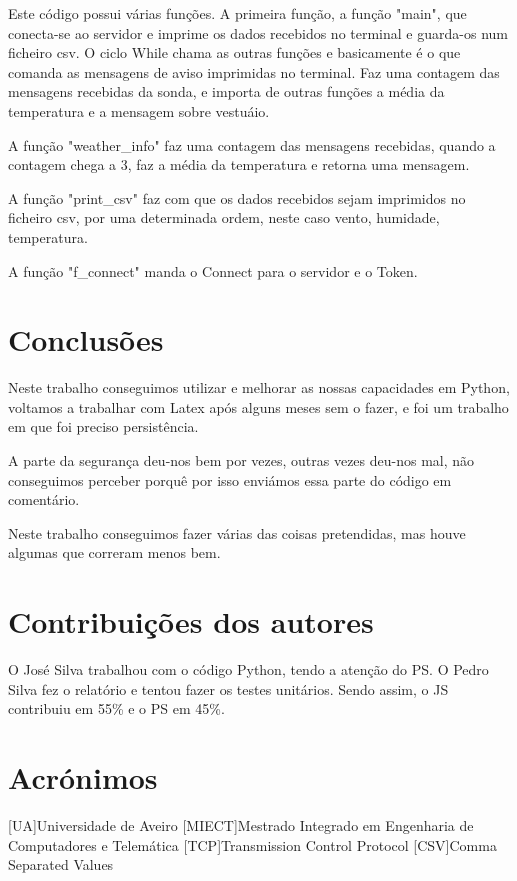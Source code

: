 \documentclass{report}
\begin{document}
Este código possui várias funções.
A primeira função, a função "main", que conecta-se ao servidor e imprime os dados recebidos no terminal e guarda-os num ficheiro \ac{csv}. 
O ciclo While chama as outras funções e basicamente é o que comanda as mensagens de aviso imprimidas no terminal. Faz uma contagem das mensagens recebidas da sonda, e importa de outras funções a média da temperatura e a mensagem sobre vestuáio.

A função "weather{\_}info" faz uma contagem das mensagens recebidas, quando a contagem chega a 3, faz a média da temperatura e retorna uma mensagem.

A função "print{\_}csv" faz com que os dados recebidos sejam imprimidos no ficheiro \ac{csv}, por uma determinada ordem, neste caso vento, humidade, temperatura.

A função "f{\_}connect" manda o Connect para o servidor e o Token.


\chapter{Conclusões}
\label{chap.conclusao}
Neste trabalho conseguimos utilizar e melhorar as nossas capacidades em Python, voltamos a trabalhar com Latex após alguns meses sem o fazer, e foi um trabalho em que foi preciso persistência.

A parte da segurança deu-nos bem por vezes, outras vezes deu-nos mal, não conseguimos perceber porquê por isso enviámos essa parte do código em comentário.

Neste trabalho conseguimos fazer várias das coisas pretendidas, mas houve algumas que correram menos bem. 

\chapter*{Contribuições dos autores}
O José Silva trabalhou com o código Python, tendo a atenção do PS. O Pedro Silva fez o relatório e tentou fazer os testes unitários.
Sendo assim, o JS contribuiu em 55\% e o PS em 45\%.

\chapter*{Acrónimos}
\begin{acronym}
[UA]{Universidade de Aveiro}
[MIECT]{Mestrado Integrado em Engenharia de Computadores e Telemática}
[TCP]{Transmission Control Protocol}
[CSV]{Comma Separated Values}
\end{acronym}


\printbibliography
\end{document}
